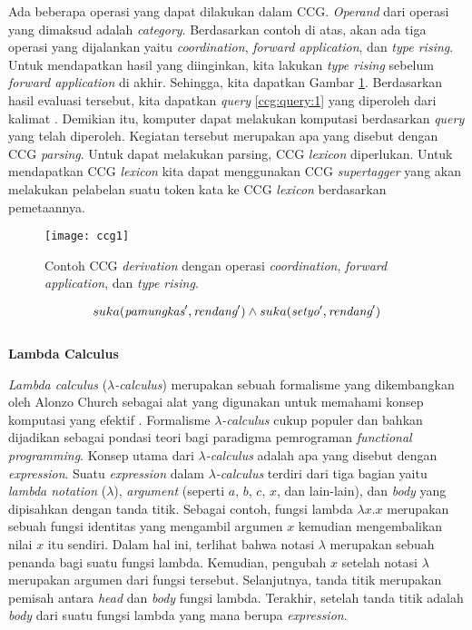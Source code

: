 Ada beberapa operasi yang dapat dilakukan dalam CCG. \textit{Operand} dari operasi
yang dimaksud adalah \textit{category}. Berdasarkan contoh di atas, akan ada tiga
operasi yang dijalankan yaitu \textit{coordination}, \textit{forward application},
dan \textit{type rising}.
Untuk mendapatkan hasil yang diinginkan, kita lakukan \textit{type rising} sebelum
\textit{forward application} di akhir.
Sehingga, kita dapatkan Gambar \ref{ccg-fig1}.
Berdasarkan hasil evaluasi tersebut, kita dapatkan \textit{query} \ref{ccg:query:1}
yang diperoleh dari kalimat .
Demikian itu, komputer dapat melakukan komputasi berdasarkan \textit{query} yang telah diperoleh.
Kegiatan tersebut merupakan apa yang disebut dengan CCG \textit{parsing}.
Untuk dapat melakukan parsing, CCG \textit{lexicon} diperlukan.
Untuk mendapatkan CCG \textit{lexicon} kita dapat menggunakan CCG \textit{supertagger}
yang akan melakukan pelabelan suatu token kata ke CCG \textit{lexicon} berdasarkan
pemetaannya.

\begin{figure}\centering\small
  \texttt{[image: ccg1]}
  \caption{
    Contoh CCG \textit{derivation} dengan operasi \textit{coordination},
    \textit{forward application}, dan \textit{type rising}.}
  \label{ccg-fig1}
\end{figure}

\begin{equation}\label{ccg:query:1}
  suka(\mbox{\it pamungkas}^\prime, \mbox{\it rendang}^\prime) \land suka(\mbox{\it setyo}^\prime, \mbox{\it rendang}^\prime)
\end{equation}
\\


\noindent\textbf{Lambda Calculus}

\textit{Lambda calculus} ({$\lambda$}\textit{-calculus}) merupakan sebuah formalisme yang dikembangkan
oleh Alonzo Church sebagai alat yang digunakan untuk memahami konsep komputasi yang efektif
\citep{DBLP:journals/corr/Rojas15}.
Formalisme {$\lambda$}\textit{-calculus} cukup populer dan bahkan dijadikan sebagai pondasi teori bagi
paradigma pemrograman \textit{functional programming}.
Konsep utama dari {$\lambda$}\textit{-calculus} adalah apa yang disebut dengan \textit{expression}.
Suatu \textit{expression} dalam {$\lambda$}\textit{-calculus} terdiri dari tiga bagian yaitu
\textit{lambda notation} ({$\lambda$}), \textit{argument} (seperti $a$, $b$, $c$, $x$, dan lain-lain),
dan \textit{body} yang dipisahkan dengan tanda titik.
Sebagai contoh, fungsi lambda ${\lambda}x. x$ merupakan sebuah fungsi identitas yang mengambil
argumen $x$ kemudian mengembalikan nilai $x$ itu sendiri.
Dalam hal ini, terlihat bahwa notasi {$\lambda$} merupakan sebuah penanda bagi suatu fungsi lambda.
Kemudian, pengubah $x$ setelah notasi {$\lambda$} merupakan argumen dari fungsi tersebut.
Selanjutnya, tanda titik merupakan pemisah antara \textit{head} dan \textit{body} fungsi lambda.
Terakhir, setelah tanda titik adalah \textit{body} dari suatu fungsi lambda yang mana berupa
\textit{expression}.

